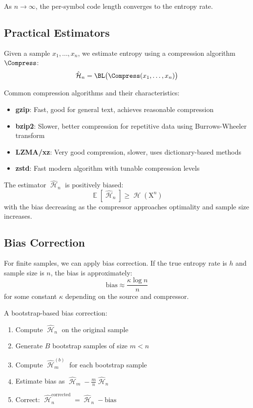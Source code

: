 \documentclass[final,11pt]{article}
\newcommand{\rv}[1]{\mathrm{#1}}
\newcommand{\entropy}{\operatorname{\mathcal{H}}}
\DeclareMathOperator{\expectation}{\mathbb{E}}
\numberwithin{equation}{section}
\theoremstyle{plain}
\theoremstyle{remark}
\begin{document}
As $n \to \infty$, the per-symbol code length converges to the entropy rate.

\subsection{Practical Estimators}
Given a sample $x_1, \ldots, x_n$, we estimate entropy using a compression algorithm $\Compress$:
\begin{equation}
    \hat{\entropy}_n = \BL\bigl(\Compress(x_1, \ldots, x_n)\bigr)
\end{equation}

Common compression algorithms and their characteristics:
\begin{itemize}
    \item \textbf{gzip}: Fast, good for general text, achieves reasonable compression
    \item \textbf{bzip2}: Slower, better compression for repetitive data using Burrows-Wheeler transform
    \item \textbf{LZMA/xz}: Very good compression, slower, uses dictionary-based methods
    \item \textbf{zstd}: Fast modern algorithm with tunable compression levels
\end{itemize}

The estimator $\hat{\entropy}_n$ is positively biased:
\begin{equation}
    \expectation[\hat{\entropy}_n] \geq \entropy(\rv{X}^n)
\end{equation}
with the bias decreasing as the compressor approaches optimality and sample size increases.

\subsection{Bias Correction}
For finite samples, we can apply bias correction. If the true entropy rate is $h$ and sample size is $n$, the bias is approximately:
\begin{equation}
    \text{bias} \approx \frac{\kappa \log n}{n}
\end{equation}
for some constant $\kappa$ depending on the source and compressor.

A bootstrap-based bias correction:
\begin{enumerate}
    \item Compute $\hat{\entropy}_n$ on the original sample
    \item Generate $B$ bootstrap samples of size $m < n$
    \item Compute $\hat{\entropy}_m^{(b)}$ for each bootstrap sample
    \item Estimate bias as $\hat{\entropy}_m - \frac{m}{n}\hat{\entropy}_n$
    \item Correct: $\hat{\entropy}_n^{\text{corrected}} = \hat{\entropy}_n - \text{bias}$
\end{enumerate}
\end{document}
